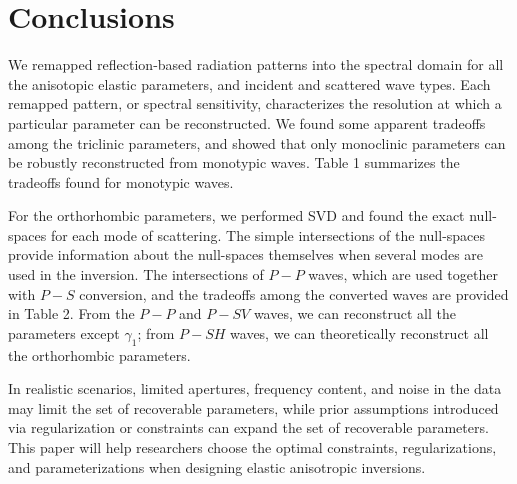 \section{Conclusions}
%
We remapped reflection-based radiation patterns into the spectral domain for all the anisotopic elastic parameters, and incident and scattered wave types. Each remapped pattern, or spectral sensitivity, characterizes the resolution at which a particular parameter can be reconstructed. We found some apparent tradeoffs among the triclinic parameters, and showed that only monoclinic parameters can be robustly reconstructed from monotypic waves. Table 1 summarizes the tradeoffs found for monotypic waves. 
%

For the orthorhombic parameters, we performed SVD and found the exact null-spaces for each mode of scattering. The simple intersections of the null-spaces provide information about the null-spaces themselves when several modes are used in the inversion. The intersections of $P-P$ waves, which are used together with $P-S$ conversion, and the tradeoffs among the converted waves are provided in Table 2. From the $P-P$ and $P-SV$ waves, we can reconstruct all the parameters except $\gamma_1$; from $P-SH$ waves, we can theoretically reconstruct all the orthorhombic parameters.

In realistic scenarios, limited apertures, frequency content, and noise in the data may limit the set of recoverable parameters, while prior assumptions introduced via regularization or constraints can expand the set of recoverable parameters. This paper will help researchers choose the optimal constraints, regularizations, and parameterizations when designing elastic anisotropic inversions. 









% 


